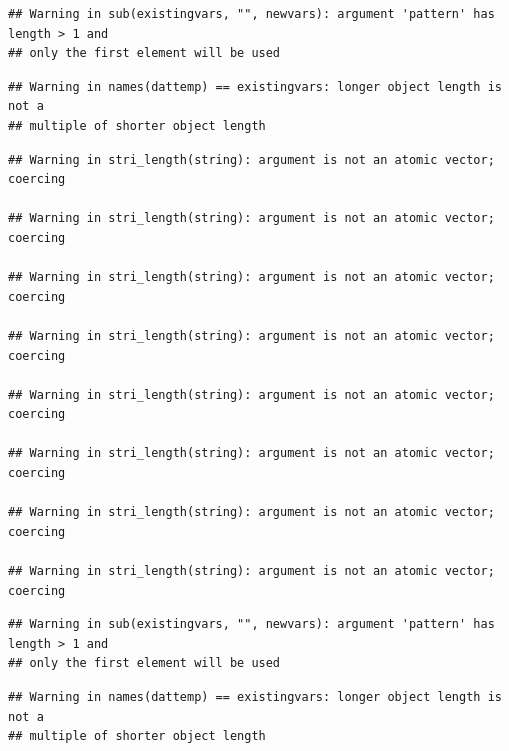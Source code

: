 \documentclass[
]{article}
\begin{document}
\begin{verbatim}
## Warning in sub(existingvars, "", newvars): argument 'pattern' has length > 1 and
## only the first element will be used
\end{verbatim}

\begin{verbatim}
## Warning in names(dattemp) == existingvars: longer object length is not a
## multiple of shorter object length
\end{verbatim}

\begin{verbatim}
## Warning in stri_length(string): argument is not an atomic vector; coercing

## Warning in stri_length(string): argument is not an atomic vector; coercing

## Warning in stri_length(string): argument is not an atomic vector; coercing

## Warning in stri_length(string): argument is not an atomic vector; coercing

## Warning in stri_length(string): argument is not an atomic vector; coercing

## Warning in stri_length(string): argument is not an atomic vector; coercing

## Warning in stri_length(string): argument is not an atomic vector; coercing

## Warning in stri_length(string): argument is not an atomic vector; coercing
\end{verbatim}

\begin{verbatim}
## Warning in sub(existingvars, "", newvars): argument 'pattern' has length > 1 and
## only the first element will be used
\end{verbatim}

\begin{verbatim}
## Warning in names(dattemp) == existingvars: longer object length is not a
## multiple of shorter object length
\end{verbatim}
\end{document}
